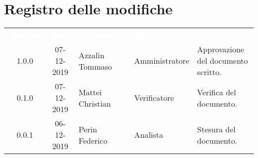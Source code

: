 \section*{Registro delle modifiche}
{
\renewcommand{\arraystretch}{1.5}
\centering
\begin{longtable}{ c c  C{4cm}  C{3cm} C{4cm}}
\textcolor{white}{\textbf{Versione}} & \textcolor{white}{\textbf{Data}} & \textcolor{white}{\textbf{Nominativo}} & \textcolor{white}{\textbf{Ruolo}} & \textcolor{white}{\textbf{Descrizione}}\\	


1.0.0 & 07-12-2019 & Azzalin Tommaso & Amministratore & Approvazione del documento scritto.  \\
		
0.1.0 & 07-12-2019 & Mattei Christian & Verificatore & Verifica del documento.  \\
		
0.0.1 & 06-12-2019 & Perin Federico & Analista & Stesura del documento.  \\
        

\end{longtable}
}